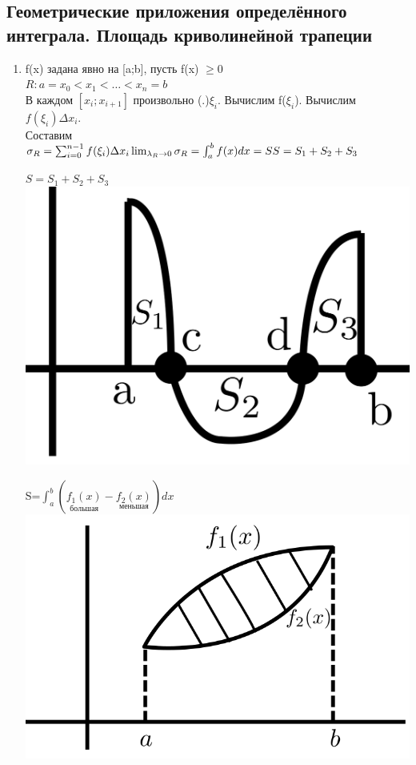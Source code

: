 \documentclass[12pt]{article}
\let\ORIincludegraphics\includegraphics
\renewcommand{\includegraphics}[2][]{\ORIincludegraphics[scale=0.65,#1]{#2}}
\begin{document}
    \subsection{Геометрические приложения определённого интеграла. Площадь криволинейной трапеции}
    \begin{enumerate}
        \item f(x) задана явно на [a;b], пусть f(x) $\geq 0$\\
        $R: a=x_0<x_1<\dots<x_n=b$\\
        В каждом $[x_i;x_{i+1}]$ произвольно (.)$\xi_i$. Вычислим f($\xi_i$). Вычислим $f(\xi_i)\Delta x_i$.\\
        Составим $\sigma_R=\sum_{i=0}^{n-1}f(\xi_i)\Delta x_i\\
        \lim_{\lambda_R \to 0}\sigma_R=\int_{a}^{b} f(x)dx=S\\ S=S_1+S_2+S_3$
        \begin{center}
            $S=S_1+S_2+S_3$\\
            \includegraphics[width=0.6\linewidth]{6.9.1.png} 
        \end{center}
        \begin{center}
            S=$\int_{a}^{b}(\underset{большая}{f_1(x)} -  \underset{меньшая}{f_2(x)})dx$\\
            \includegraphics[width=0.7\linewidth]{6.9.2.png}
        \end{center}

\end{enumerate}
\end{document}
